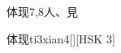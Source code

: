 \begin{entry}{体现}{7,8}{⼈、⾒}
  \begin{phonetics}{体现}{ti3xian4}[][HSK 3]
  \end{phonetics}
\end{entry}
